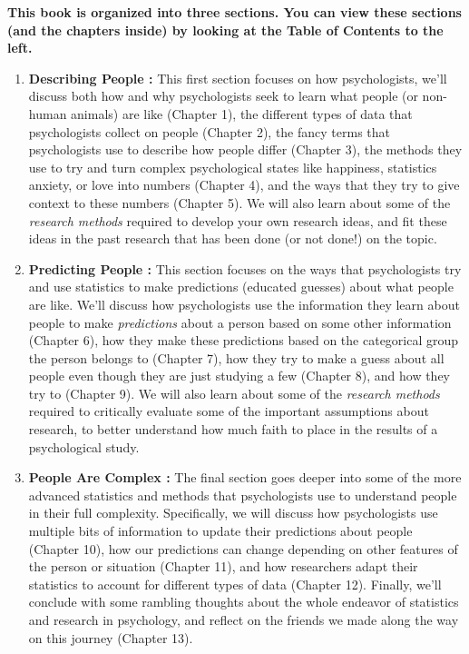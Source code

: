 \documentclass[
  letterpaper,
  DIV=11,
  numbers=noendperiod,
  oneside]{scrreprt}
\begin{document}

\textbf{This book is organized into three sections. You can view these
sections (and the chapters inside) by looking at the Table of Contents
to the left.}

\begin{enumerate}
\def\labelenumi{\arabic{enumi}.}
\item
  \textbf{Describing People :} This first section focuses on how
  psychologists, we'll discuss both how and why psychologists seek to
  learn what people (or non-human animals) are like (Chapter 1), the
  different types of data that psychologists collect on people (Chapter
  2), the fancy terms that psychologists use to describe how people
  differ (Chapter 3), the methods they use to try and turn complex
  psychological states like happiness, statistics anxiety, or love into
  numbers (Chapter 4), and the ways that they try to give context to
  these numbers (Chapter 5). We will also learn about some of the
  \emph{research methods} required to develop your own research ideas,
  and fit these ideas in the past research that has been done (or not
  done!) on the topic.
\item
  \textbf{Predicting People :} This section focuses on the ways that
  psychologists try and use statistics to make predictions (educated
  guesses) about what people are like. We'll discuss how psychologists
  use the information they learn about people to make \emph{predictions}
  about a person based on some other information (Chapter 6), how they
  make these predictions based on the categorical group the person
  belongs to (Chapter 7), how they try to make a guess about all people
  even though they are just studying a few (Chapter 8), and how they try
  to (Chapter 9). We will also learn about some of the \emph{research
  methods} required to critically evaluate some of the important
  assumptions about research, to better understand how much faith to
  place in the results of a psychological study.
\item
  \textbf{People Are Complex :} The final section goes deeper into some
  of the more advanced statistics and methods that psychologists use to
  understand people in their full complexity. Specifically, we will
  discuss how psychologists use multiple bits of information to update
  their predictions about people (Chapter 10), how our predictions can
  change depending on other features of the person or situation (Chapter
  11), and how researchers adapt their statistics to account for
  different types of data (Chapter 12). Finally, we'll conclude with
  some rambling thoughts about the whole endeavor of statistics and
  research in psychology, and reflect on the friends we made along the
  way on this journey (Chapter 13).
\end{enumerate}
\end{document}
